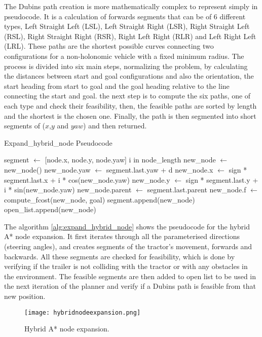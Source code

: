 The Dubins path creation is more mathematically complex to represent simply in pseudocode. 
It is a calculation of forwards segments that can be of 6 different types, 
Left Straight Left (LSL), Left Straight Right (LSR), Right Straight Left (RSL), Right Straight Right (RSR), 
Right Left Right (RLR) and Left Right Left (LRL). These paths are the shortest possible 
curves connecting two configurations for a non-holonomic vehicle with a fixed minimum radius.
The process is divided into six main steps, normalizing the problem, by calculating the 
distances between start and goal configurations and also the orientation, the start 
heading from start to goal and the goal heading relative to the line connecting the start and goal. 
the next step is to compute the six paths, one of each type and check their feasibility, then, 
the feasible paths are sorted by length and the shortest is the chosen one. Finally, 
the path is then segmented into short segments of ($x$,$y$ and $yaw$) and then returned.
\begin{algorithm}[h]
\caption{Expand\_hybrid\_node Pseudocode}
\label{alg:expand_hybrid_node}
\begin{algorithmic}[1]
            \State segment $\gets$ [node.x, node.y, node.yaw]
            \For i in node\_length
                \State new\_node $\gets$ new\_node()
                \State new\_node.yaw $\gets$ segment.last.yaw + d
                \State new\_node.x $\gets$ sign * segment.last.x + i * cos(new\_node.yaw)
                \State new\_node.y $\gets$ sign * segment.last.y + i * sin(new\_node.yaw)
                \State new\_node.parent $\gets$ segment.last.parent
                \State new\_node.f $\gets$ compute\_fcost(new\_node, goal)
                \State segment.append(new\_node)
            \EndFor
                \State open\_list.append(new\_node)
            \EndIf
        \EndFor
    \EndFor
\EndFunction
\end{algorithmic}
\end{algorithm}

The algorithm \ref{alg:expand_hybrid_node} shows the pseudocode for the hybrid A* node expansion. It first 
iterates through all the parameterised directions (steering angles), and creates 
segments of the tractor's movement, forwards and backwards. All these segments are checked for 
feasibility, which is done by verifying if the trailer is not colliding with the tractor or 
with any obstacles in the environment. The feasible segments are then added to open list to be used 
in the next iteration of the planner and verify if a Dubins path is feasible from that new position.
\begin{figure}[h]
    \centering
    \texttt{[image: hybridnodeexpansion.png]}
    \caption{Hybrid A* node expansion.}
    \label{fig:hybridnodeexpansion}
\end{figure}

